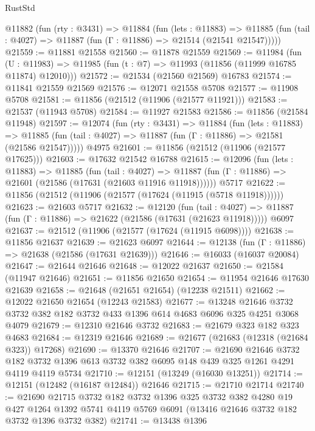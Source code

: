 \begin{lexlean}{RustStd}
\begin{coremodule}
  @11882
    (fun (rty : @3431) =>
    @11884
      (fun (lets : @11883) =>
      @11885 (fun (tail : @4027) => @11887 (fun (Γ : @11886) => @21514 (@21541 @21547)))))
@21559 := @11881 @21558
@21560 := @11878 @21559
@21569 := @11984
    (fun (U : @11983) => @11985 (fun (t : @7) => @11993 (@11856 (@11999 @16785 @11874) @12010)))
@21572 := @21534 (@21560 @21569) @16783
@21574 := @11841 @21559 @21569
@21576 := @12071 @21558 @5708
@21577 := @11908 @5708
@21581 := @11856 (@21512 (@11906 (@21577 @11921)))
@21583 := @21537 (@11943 @5708)
@21584 := @11927 @21583
@21586 := @11856 (@21584 @11948)
@21597 := @12074
    (fun (rty : @3431) =>
    @11884
      (fun (lets : @11883) =>
      @11885 (fun (tail : @4027) => @11887 (fun (Γ : @11886) => @21581 (@21586 @21547)))))
    @4975
@21601 := @11856 (@21512 (@11906 (@21577 @17625)))
@21603 := @17632 @21542 @16788
@21615 := @12096
    (fun (lets : @11883) =>
    @11885
      (fun (tail : @4027) =>
      @11887 (fun (Γ : @11886) => @21601 (@21586 (@17631 (@21603 @11916 @11918))))))
    @5717
@21622 := @11856 (@21512 (@11906 (@21577 (@17624 (@11915 (@5718 @11918))))))
@21623 := @21603 @5717
@21632 := @12120
    (fun (tail : @4027) => @11887 (fun (Γ : @11886) => @21622 (@21586 (@17631 (@21623 @11918)))))
    @6097
@21637 := @21512 (@11906 (@21577 (@17624 (@11915 @6098))))
@21638 := @11856 @21637
@21639 := @21623 @6097
@21644 := @12138 (fun (Γ : @11886) => @21638 (@21586 (@17631 @21639)))
@21646 := @16033 (@16037 @20084)
@21647 := @21644 @21646
@21648 := @12022 @21637
@21650 := @21584 (@11947 @21646)
@21651 := @11856 @21650
@21654 := @11954 @21646 @17630 @21639
@21658 := @21648 (@21651 @21654) (@12238 @21511)
@21662 := @12022 @21650 @21654 (@12243 @21583)
@21677 := @13248
    @21646
    @3732
    @3732
    @382
    @182
    @3732
    @433
    @1396
    @614
    @4683
    @6096
    @325
    @4251
    @3068
    @4079
@21679 := @12310 @21646 @3732
@21683 := @21679 @323 @182 @323 @4683
@21684 := @12319 @21646
@21689 := @21677 (@21683 (@12318 (@21684 @323)) @17268)
@21690 := @13370 @21646
@21707 := @21690
    @21646
    @3732
    @182
    @3732
    @1396
    @613
    @3732
    @382
    @6095
    @148
    @439
    @325
    @1261
    @4291
    @4119
    @4119
    @5734
@21710 := @12151 (@13249 (@16030 @13251))
@21714 := @12151 (@12482 (@16187 @12484)) @21646
@21715 := @21710 @21714
@21740 := @21690
    @21715
    @3732
    @182
    @3732
    @1396
    @325
    @3732
    @382
    @4280
    @19
    @427
    @1264
    @1392
    @5741
    @4119
    @5769
    @6091
    (@13416 @21646 @3732 @182 @3732 @1396 @3732 @382)
@21741 := @13438 @1396

\end{coremodule}
\end{lexlean}

